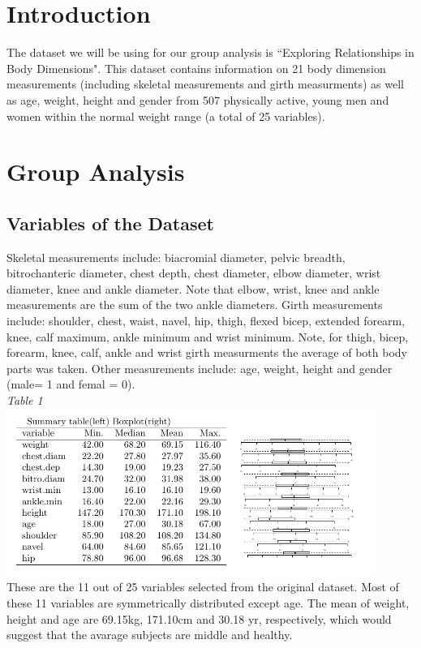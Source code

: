 \documentclass[11pt]{article}\usepackage[]{graphicx}\usepackage[]{color}
\begin{document}

\section{Introduction} %

The dataset we will be using for our group analysis is ``Exploring Relationships in Body Dimensions". This dataset contains information on 21 body dimension measurements (including skeletal measurements and girth measurments) as well as age, weight, height and gender from 507 physically active, young men and women within the normal weight range (a total of 25 variables).

\section{Group Analysis} 





\subsection{Variables of the Dataset}

Skeletal measurements include: biacromial diameter, pelvic breadth, bitrochanteric diameter, chest depth, chest diameter, elbow diameter, wrist diameter, knee and ankle diameter. Note that elbow, wrist, knee and ankle measurements are the sum of the two ankle diameters. Girth measurements include: shoulder, chest, waist, navel, hip, thigh, flexed bicep, extended forearm, knee, calf maximum, ankle minimum and wrist minimum. Note, for thigh, bicep, forearm, knee, calf, ankle and wrist girth measurments the average of both body parts was taken. Other measurements include: age, weight, height and gender (male= 1 and femal = 0).\\

\textit{Table 1}\\
\includegraphics[width=0.9\textwidth]{summary_table}\\
These are the 11 out of 25 variables selected from the original dataset. Most of these 11 variables are symmetrically distributed except age. The mean of weight, height and age are 69.15kg, 171.10cm and 30.18 yr, respectively, which would suggest that the avarage subjects are middle and healthy.
\end{document}
